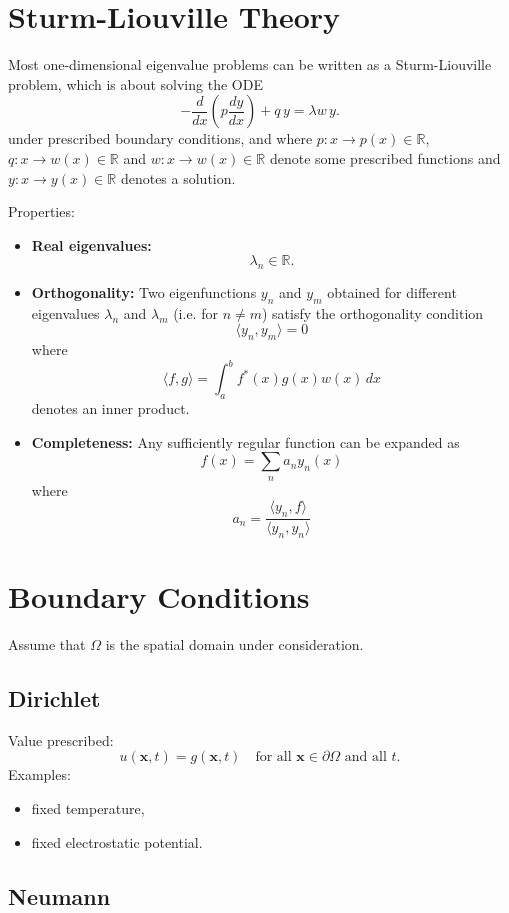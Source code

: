 \documentclass[aps,prl,twocolumn,groupedaddress]{revtex4-2}
\newcommand{\RR}{\mathbb{R}}
\begin{document}
\section{Sturm-Liouville Theory}

Most one-dimensional eigenvalue problems can be written as a Sturm-Liouville problem, which is about solving the ODE
$$
-\frac{d}{dx}
\left(
p\frac{dy}{dx}
\right)
+
q\,y
=
\lambda w\,y.
$$
under prescribed boundary conditions, and where $p:x\to p(x)\in \RR$, $q:x\to w(x)\in \RR$ and $w:x\to w(x)\in \RR$ denote some prescribed functions and $y:x\to y(x)\in \RR$ denotes a solution.

Properties:
\begin{itemize}
\item {\bf Real eigenvalues:}
$$
\lambda_n\in\mathbb R.
$$

\item {\bf Orthogonality:}
Two eigenfunctions $y_n$ and $y_m$ obtained for different eigenvalues $\lambda_n$ and $\lambda_m$ (i.e. for $n\neq m$) satisfy the orthogonality condition
$$
\langle y_n,y_m \rangle
=
0
$$
where
$$
\langle f,g \rangle
=
\int_a^b
f^*(x)g(x)w(x)\,dx
$$
denotes an inner product.

\item {\bf Completeness:}
Any sufficiently regular function can be expanded as
$$
f(x)
=
\sum_n
a_n y_n(x)
$$
where
$$
a_n 
= 
\frac{\langle y_n,f\rangle}{\langle y_n,y_n\rangle}
$$
\end{itemize}

\section{Boundary Conditions}

Assume that $\Omega$ is the spatial domain under consideration.

\subsection{Dirichlet}

Value prescribed:
$$
u(\mathbf x,t)=g(\mathbf x,t)
\quad\text{for all $\mathbf x\in \partial\Omega$ and all $t$.}
$$
Examples:
\begin{itemize}
\item fixed temperature,
\item fixed electrostatic potential.
\end{itemize}

\subsection{Neumann}
\end{document}

